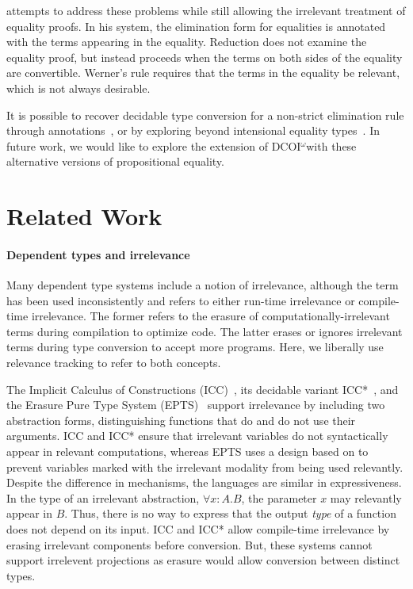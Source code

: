 \documentclass[acmsmall, screen=true, nonacm=true,
  review=\ifpublic false\else true\fi,
  anonymous=\ifanonymous true\else false\fi
]{acmart}
\makeatletter
\newcommand{\name}{\texorpdfstring{DCOI$^{\omega}$\@\xspace}{DCOI-omega}}
\makeatother
\begin{document}
\citet{werner:proofirrel} attempts to address these problems while still
allowing the irrelevant treatment of equality proofs. In his system, the
elimination form for equalities is annotated with the terms appearing
in the equality. Reduction does not examine the equality proof,
but instead proceeds when the terms on both sides of the equality are convertible.
Werner's rule requires that the terms in the equality be relevant, which is
not always desirable.

It is possible to recover decidable type conversion for a non-strict
elimination rule through annotations~\citep{liu:dependently}, or by exploring
beyond intensional equality types~\citep{pujet:ttobs}. In future work, we
would like to explore the extension of \name with these alternative versions
of propositional equality.

\section{Related Work}

\paragraph{Dependent types and irrelevance}
\label{sec:discuss-irrel}

Many dependent type systems include a notion of irrelevance, although the term
has been used inconsistently and refers to either run-time irrelevance or
compile-time irrelevance. The former refers to the erasure of
computationally-irrelevant terms during compilation to optimize code.
The latter erases or ignores irrelevant terms during type conversion to accept
more programs. Here, we liberally use relevance tracking to refer to both
concepts.

The Implicit Calculus of Constructions (ICC)~\citep{miquel:icc}, its decidable
variant ICC*~\citep{barras:icc}, and the Erasure Pure Type System
(EPTS)~\citep{mishra:erasure} support irrelevance by including two abstraction
forms, distinguishing functions that do and do not use their arguments.  ICC
and ICC* ensure that irrelevant variables do not syntactically appear in
relevant computations, whereas EPTS uses a design based on
\citet{pfenning:modal} to prevent variables marked with the irrelevant
modality from being used relevantly.  Despite the difference in mechanisms,
the languages are similar in expressiveness. In the type of an irrelevant
abstraction, $\forall x\!\!:\!\!A.B$, the parameter $x$ may relevantly
appear in $B$. Thus, there is no way to express that the output \emph{type}
of a function does not depend on its input.  ICC and ICC* allow
compile-time irrelevance by erasing irrelevant components before
conversion. But, these systems cannot support irrelevent projections 
as erasure would allow conversion between distinct types.
\end{document}
